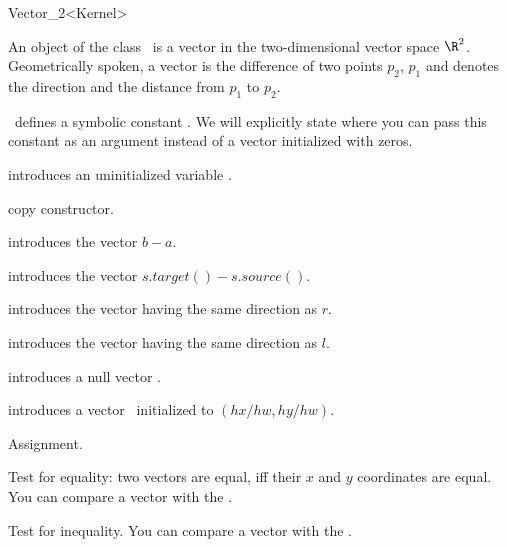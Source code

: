 \begin{ccRefClass} {Vector_2<Kernel>}

\ccDefinition

An object of the class \ccRefName\ is a vector in the two-dimensional 
vector space $\R^2$. Geometrically spoken, a vector is the difference
of two points $p_2$, $p_1$ and denotes the direction and the distance
from   $p_1$ to $p_2$. 

\cgal\ defines a symbolic constant . We 
will explicitly state where you can pass this constant as an argument
instead of a vector initialized with zeros.


\ccCreation
{}


\ccHidden{}
             {introduces an uninitialized variable \ccVar.}

\ccHidden {}
            {copy constructor.}

            {introduces the vector $b-a$.}

            {introduces the vector $s.target()-s.source()$.}

            {introduces the vector having the same direction as $r$.}

            {introduces the vector having the same direction as $l$.}

            {introduces a null vector \ccVar.}

            {introduces a vector \ccVar\ initialized to $(hx/hw,hy/hw)$.
             \ccPrecond {} }


\ccOperations

\ccHidden {}
        {Assignment.}

       {Test for equality: two vectors are equal, iff their $x$ and $y$ 
        coordinates are equal. You can compare a vector with the
        .}

       {Test for inequality. You can compare a vector with the
        .}


\end{ccRefClass}
